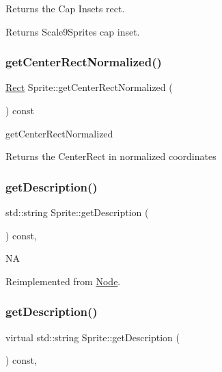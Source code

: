 Returns the Cap Insets rect. 

\begin{DoxyReturn}{Returns}
Scale9\+Sprite\textquotesingle{}s cap inset. 
\end{DoxyReturn}
\mbox{\label{classSprite_ad3a942ac9bc35aecc8efa6cb38fd4d5a}} 
\subsubsection{\texorpdfstring{get\+Center\+Rect\+Normalized()}{getCenterRectNormalized()}}
{\footnotesize\ttfamily \hyperlink{classRect}{Rect} Sprite\+::get\+Center\+Rect\+Normalized (\begin{DoxyParamCaption}{ }\end{DoxyParamCaption}) const\hspace{0.3cm}{\ttfamily [virtual]}}

get\+Center\+Rect\+Normalized

Returns the Center\+Rect in normalized coordinates \mbox{\label{classSprite_acc5ff8de93a81ddd7f3d4af5c7ba0d39}} 
\subsubsection{\texorpdfstring{get\+Description()}{getDescription()}\hspace{0.1cm}{\footnotesize\ttfamily [1/2]}}
{\footnotesize\ttfamily std\+::string Sprite\+::get\+Description (\begin{DoxyParamCaption}{ }\end{DoxyParamCaption}) const\hspace{0.3cm}{\ttfamily [override]}, {\ttfamily [virtual]}}

NA 

Reimplemented from \hyperlink{classNode_a41710375a0d92a4ee54c39fe123b5912}{Node}.

\mbox{\label{classSprite_af35014afbb571e3781023322613b695b}} 
\subsubsection{\texorpdfstring{get\+Description()}{getDescription()}\hspace{0.1cm}{\footnotesize\ttfamily [2/2]}}
{\footnotesize\ttfamily virtual std\+::string Sprite\+::get\+Description (\begin{DoxyParamCaption}{ }\end{DoxyParamCaption}) const\hspace{0.3cm}{\ttfamily [override]}, {\ttfamily [virtual]}}

